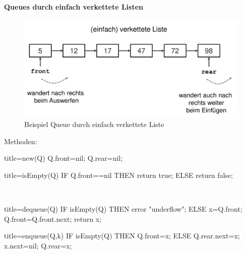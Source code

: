 \documentclass[
    ngerman,
    color=3b,
    load_common, %
    summary,
    boxarc,
]{tuda_summary}
\begin{document}
\paragraph{Queues durch einfach verkettete Listen}\mbox{}
\begin{figure}[h]
    \centering
    \includegraphics[width=12cm]{pictures/queuesListe1.pdf}
    \caption{Beispiel Queue durch einfach verkettete Liste}
\end{figure}
\FloatBarrier
Methoden:\\
\begin{minipage}[t]{.49\textwidth}\mbox{}
    \begin{codeBlock}[autogobble]{title={new(Q)}}
        Q.front=nil;
        Q.rear=nil;
    \end{codeBlock}
\end{minipage}
\begin{minipage}[t]{.5\textwidth}\mbox{}
    \begin{codeBlock}[autogobble]{title={isEmpty(Q)}}
        IF Q.front==nil THEN
            return true;
        ELSE
            return false;
    \end{codeBlock}
\end{minipage}
\\
\begin{minipage}[t]{.49\textwidth}\mbox{}
    \begin{codeBlock}[autogobble]{title={dequeue(Q)}}
        IF isEmpty(Q) THEN
            error "underflow";
        ELSE
            x=Q.front;
            Q.front=Q.front.next;
            return x;
    \end{codeBlock}
\end{minipage}
\begin{minipage}[t]{.5\textwidth}\mbox{}
    \begin{codeBlock}[autogobble]{title={enqueue(Q,k)}}
        IF isEmpty(Q) THEN
            Q.front=x;
        ELSE
            Q.rear.next=x;
        x.next=nil;
        Q.rear=x;
    \end{codeBlock}
\end{minipage}
\end{document}
